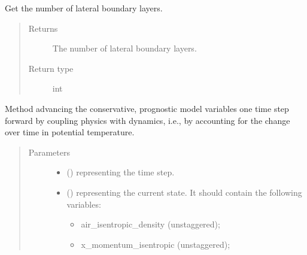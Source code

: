 \documentclass[letterpaper,10pt,english]{sphinxmanual}
\begin{document}
\begin{fulllineitems}
\begin{fulllineitems}
\label{\detokenize{api:tasmania.dycore.prognostic_isentropic.PrognosticIsentropic.nb}}
Get the number of lateral boundary layers.
\begin{quote}\begin{description}
\item[{Returns}] \leavevmode
The number of lateral boundary layers.

\item[{Return type}] \leavevmode
int

\end{description}\end{quote}

\end{fulllineitems}


\begin{fulllineitems}
\label{\detokenize{api:tasmania.dycore.prognostic_isentropic.PrognosticIsentropic.step_coupling_physics_with_dynamics}}
Method advancing the conservative, prognostic model variables one time step forward by coupling physics with
dynamics, i.e., by accounting for the change over time in potential temperature.
\begin{quote}\begin{description}
\item[{Parameters}] \leavevmode\begin{itemize}
\item {} 
 () \textendash{}  representing the time step.

\item {} 
 () \textendash{} 
{\hyperref[\detokenize{api:tasmania.storages.state_isentropic.StateIsentropic}]{}} representing the current state.
It should contain the following variables:
\begin{itemize}
\item {} 
air\_isentropic\_density (unstaggered);

\item {} 
x\_momentum\_isentropic (unstaggered);


\end{itemize}
\end{itemize}
\end{description}
\end{quote}
\end{fulllineitems}
\end{fulllineitems}
\end{document}
